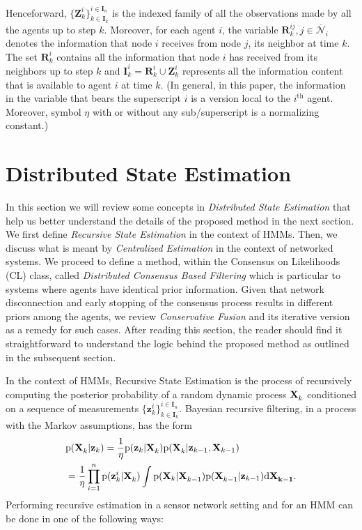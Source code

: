 \documentclass[conference]{IEEEtran}
\newcommand{\vect}[1]{{\mathbf{#1}}}
\theoremstyle{remark}
\newcommand{\XX}[3][2]{\mathbf{X}_{\tiny #2}^{\tiny #3}}
\newcommand{\pr}{\textrm{p}}
\newcommand{\bIn}{\boldsymbol{I}_{{n}}}
\newcommand{\bIk}{\boldsymbol{I}_{{k}}}
\newcommand{\zz}[3][2]{\mathbf{z}_{ #2}^{ #3}}
\newcommand{\ZZ}[3][2]{\mathbf{Z}_{ #2}^{ #3}}
\begin{document}
Henceforward, $\{\ZZ{k}{i}\}^{i\in\bIn}_{k\in\bIk}$ is the indexed family of all the 
observations made by all the agents up to step $k$. Moreover, for each agent 
$i$, the variable $\vect{R}_{k}^{ij}, j \in \overline{\mathcal{N}}_i $ denotes 
the information that node $i$ receives from node $j$, its neighbor at time 
$k$. The set $\vect{R}_{k}^i$ contains all the information that node $i$ has 
received from its neighbors up to step $k$ and $\vect{I}_{k}^i = \vect{R}_{k}^i 
\cup \vect{Z}_{k}^i$ represents all the information content that is available 
to agent $i$ at time $k$. (In 
general, in this paper, the information in the 
variable that bears the superscript $i$ is a version local to the $i^\text{th}$ 
agent. Moreover, symbol $\eta$ with or without any sub/superscript is a 
normalizing constant.)
\printnomenclature
\section{Distributed State Estimation} \label{subsec:Preliminaries}
In this section we will review some concepts in \textit{Distributed State 
Estimation} that help us better understand the details of the proposed method 
in 
the next section. We first define \textit{Recursive State Estimation} in the 
context of HMMs. Then, we discuss what is meant by \textit{Centralized 
Estimation} in the context of networked systems. We proceed to define 
a method, within the Consensus on Likelihoods (CL) class, called
\textit{Distributed Consensus Based Filtering} which is particular to systems 
where agents have identical prior information. Given that network disconnection 
and early stopping of the consensus process results in different priors among 
the agents, we review \textit{Conservative Fusion} and its iterative version as 
a remedy for such cases. After reading this section, the reader should find it 
straightforward to understand the logic behind the proposed method as outlined in the 
subsequent section. 

In the context of HMMs, Recursive State Estimation is the process of recursively computing the posterior probability of a random dynamic process $\XX[]{k}{}$ conditioned on a sequence of measurements $\{\zz{k}{i}\}^{i\in\bIn}_{k\in\bIk}$. Bayesian recursive filtering, in a process with the Markov assumptions, has the form
\begin{align}
\label{eq:geb}
&\pr(\XX[]{k}{}|\vect{z}_{k})  = \frac{1}{\eta}\pr(\vect{z}_{k}| \XX[]{k}{})\pr(\XX[]{k}{}|\vect{z}_{k-1},\vect{X}_{k-1}) \\
&= \frac{1}{\eta}\prod_{i=1}^{n} \pr(\vect{z}_{k}^i | \XX[]{k}{}) \int \pr(\vect{X}_{k} | \XX[]{k-1}{}) \pr(\XX[]{k-1}{}|\vect{z}_{k-1}) \text{d}\vect{\XX[]{k-1}}.\nonumber 
\end{align}
Performing recursive estimation in a sensor network setting and for an HMM can be done in one of the following ways:
\end{document}
